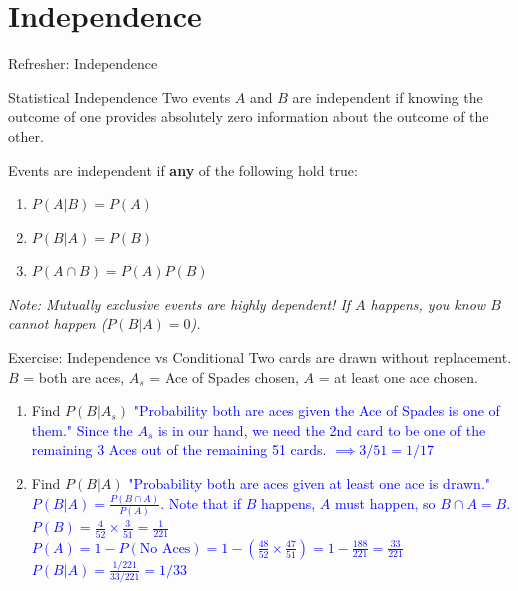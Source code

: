 \documentclass[aspectratio=169]{beamer}
\begin{document}
\section{Independence}

\begin{frame}{Refresher: Independence}
    \begin{block}{Statistical Independence}
        Two events $A$ and $B$ are independent if knowing the outcome of one provides absolutely zero information about the outcome of the other. 
    \end{block}
    
    \vspace{0.2cm}
    Events are independent if \textbf{any} of the following hold true:
    \begin{enumerate}
        \item $P(A|B) = P(A)$
        \item $P(B|A) = P(B)$
        \item $P(A \cap B) = P(A)P(B)$
    \end{enumerate}
    
    \vspace{0.2cm}
    \textit{Note: Mutually exclusive events are highly dependent! If $A$ happens, you know $B$ cannot happen ($P(B|A)=0$).}
\end{frame}

\begin{frame}{Exercise: Independence vs Conditional}
    Two cards are drawn without replacement. 
    $B$ = both are aces, $A_s$ = Ace of Spades chosen, $A$ = at least one ace chosen.
    
    \vspace{0.2cm}
    \begin{enumerate}
        \item Find $P(B|A_s)$ \pause
        \newline \textcolor{blue}{"Probability both are aces given the Ace of Spades is one of them."}
        \newline \textcolor{blue}{Since the $A_s$ is in our hand, we need the 2nd card to be one of the remaining 3 Aces out of the remaining 51 cards. $\implies 3/51 = 1/17$} \pause
        
        \vspace{0.2cm}
        \item Find $P(B|A)$ \pause
        \newline \textcolor{blue}{"Probability both are aces given at least one ace is drawn."}
        \newline \textcolor{blue}{$P(B|A) = \frac{P(B \cap A)}{P(A)}$. Note that if $B$ happens, $A$ must happen, so $B \cap A = B$.}
        \newline \textcolor{blue}{$P(B) = \frac{4}{52} \times \frac{3}{51} = \frac{1}{221}$}
        \newline \textcolor{blue}{$P(A) = 1 - P(\text{No Aces}) = 1 - \left(\frac{48}{52} \times \frac{47}{51}\right) = 1 - \frac{188}{221} = \frac{33}{221}$}
        \newline \textcolor{blue}{$P(B|A) = \frac{1/221}{33/221} = 1/33$}
    \end{enumerate}
\end{frame}
\end{document}
